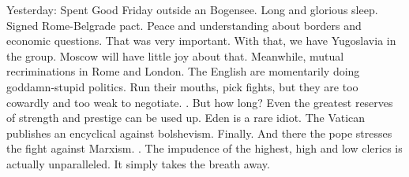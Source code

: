 Yesterday: Spent Good Friday outside an Bogensee. Long and glorious sleep. Signed Rome-Belgrade pact. Peace and understanding about borders and economic questions. That was very important. With that, we have Yugoslavia in the group. Moscow will have little joy about that. Meanwhile, mutual recriminations in Rome and London. The English are momentarily doing goddamn-stupid politics. Run their mouths, pick fights, but they are too cowardly and too weak to negotiate. . But how long? Even the greatest reserves of strength and prestige can be used up. Eden is a rare idiot. The Vatican publishes an encyclical against bolshevism. Finally. And there the pope stresses the fight against Marxism. . The impudence of the highest, high and low clerics is actually unparalleled. It simply takes the breath away.

